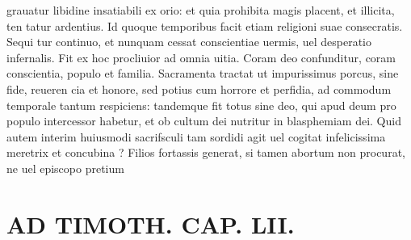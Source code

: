 \documentclass{article}
\begin{document}
\begin{pages}
grauatur libidine insatiabili ex orio: et quia prohibita magis placent, et illicita, ten tatur ardentius. Id quoque temporibus facit etiam religioni suae consecratis. Sequi tur continuo, et nunquam cessat conscientiae uermis, uel desperatio infernalis. Fit ex hoc procliuior ad omnia uitia. Coram deo confunditur, coram conscientia, populo et familia. Sacramenta tractat ut impurissimus porcus, sine fide, reueren cia et honore, sed potius cum horrore et perfidia, ad commodum temporale tantum respiciens: tandemque fit totus sine deo, qui apud deum pro populo intercessor habetur, et ob cultum dei nutritur in blasphemiam dei. Quid autem interim huiusmodi sacrifsculi tam sordidi agit uel cogitat infelicissima meretrix et concubina ? Filios fortassis generat, si tamen abortum non procurat, ne uel episcopo pretium  \pend
\section*{AD TIMOTH. CAP. LII. }

\end{pages}
\end{document}
